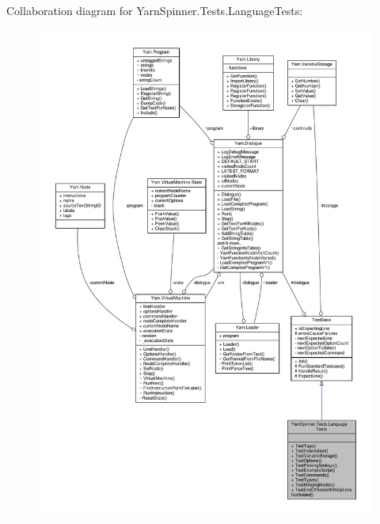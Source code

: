 Collaboration diagram for Yarn\-Spinner.\-Tests.\-Language\-Tests\-:
\nopagebreak
\begin{figure}[H]
\begin{center}
\leavevmode
\includegraphics[width=350pt]{d6/dc0/a00734}
\end{center}
\end{figure}
